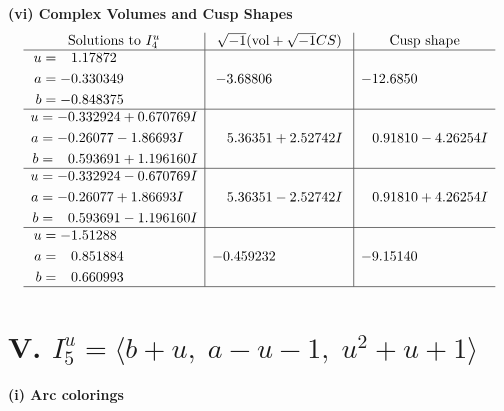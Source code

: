 \documentclass[1p]{elsarticle_modified}
\theoremstyle{definition}
\newcommand{\I}{\sqrt{-1}}
\begin{document}
\newpage\flushleft \textbf{(vi) Complex Volumes and Cusp Shapes}
$$\begin{array}{c|c|c}  
\text{Solutions to }I^u_{4}& \I (\text{vol} + \sqrt{-1}CS) & \text{Cusp shape}\\
 \hline 
\begin{aligned}
u &= \phantom{-}1.17872\phantom{ +0.000000I} \\
a &= -0.330349\phantom{ +0.000000I} \\
b &= -0.848375\phantom{ +0.000000I}\end{aligned}
 & -3.68806\phantom{ +0.000000I} & -12.6850\phantom{ +0.000000I} \\ \hline\begin{aligned}
u &= -0.332924 + 0.670769 I \\
a &= -0.26077 - 1.86693 I \\
b &= \phantom{-}0.593691 + 1.196160 I\end{aligned}
 & \phantom{-}5.36351 + 2.52742 I & \phantom{-}0.91810 - 4.26254 I \\ \hline\begin{aligned}
u &= -0.332924 - 0.670769 I \\
a &= -0.26077 + 1.86693 I \\
b &= \phantom{-}0.593691 - 1.196160 I\end{aligned}
 & \phantom{-}5.36351 - 2.52742 I & \phantom{-}0.91810 + 4.26254 I \\ \hline\begin{aligned}
u &= -1.51288\phantom{ +0.000000I} \\
a &= \phantom{-}0.851884\phantom{ +0.000000I} \\
b &= \phantom{-}0.660993\phantom{ +0.000000I}\end{aligned}
 & -0.459232\phantom{ +0.000000I} & -9.15140\phantom{ +0.000000I}\\
 \hline 
 \end{array}$$\newpage\newpage\renewcommand{\arraystretch}{1}
\centering \section*{V. $I^u_{5}= \langle b+u,\;a- u-1,\;u^2+u+1 \rangle$}
\flushleft \textbf{(i) Arc colorings}\\
\end{document}
